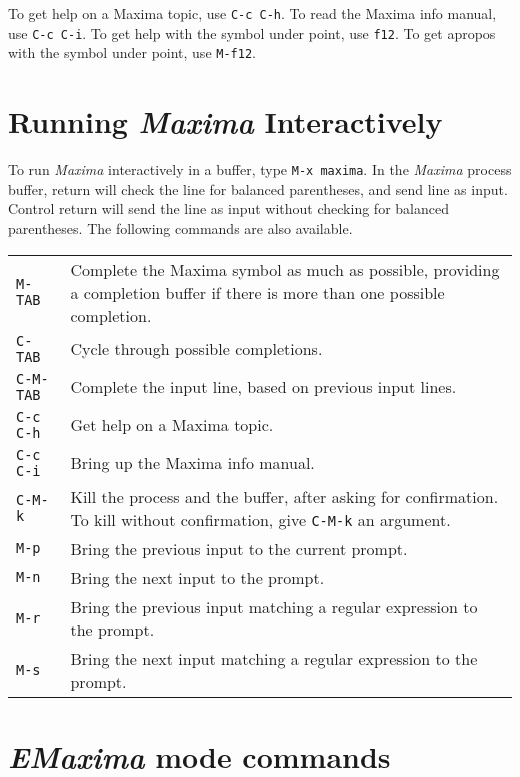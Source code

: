 \documentclass{article}
\newcommand{\emx}{\textsl{\sffamily EMaxima}}
\newcommand{\mx}{\textsl{\sffamily Maxima}}
\begin{document}
To get help on a Maxima topic, use \texttt{C-c C-h}.
To read the Maxima info manual, use \texttt{C-c C-i}.
To get help with the symbol under point, use \texttt{f12}.
To get apropos with the symbol under point, use \texttt{M-f12}.


\section{Running \mx{} Interactively}

\noindent
To run \mx{} interactively in a buffer, type \texttt{M-x maxima}.
In the \mx{} process buffer,
return will check the line for balanced parentheses, and send line as input.
Control return will send the line as input without checking for balanced
parentheses.  The following commands are also available.

\smallskip

\begin{tabular}{p{\firstcol}p{\secondcol}}
\texttt{M-TAB} & Complete the Maxima symbol as much as possible, providing
     a completion buffer if there is more than one possible completion.\\
\texttt{C-TAB} & Cycle through possible completions.\\
\texttt{C-M-TAB} & Complete the input line, based on previous input lines.\\
\texttt{C-c C-h} & Get help on a Maxima topic.\\
\texttt{C-c C-i} & Bring up the Maxima info manual.\\
\texttt{C-M-k} & Kill the process and the buffer, after asking for
  confirmation.  To kill without confirmation, give \texttt{C-M-k} an
  argument.\\
\texttt{M-p} & Bring the previous input to the current prompt.\\
\texttt{M-n} & Bring the next input to the prompt.\\
\texttt{M-r} & Bring the previous input matching
  a regular expression to the prompt.\\
\texttt{M-s} & Bring the next input matching
  a regular expression to the prompt.
\end{tabular}



\newpage

\section{\emx{} mode commands}
\end{document}
